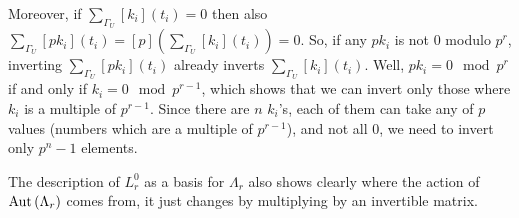 \begin{remark}
	Moreover, if $\sum_{\Gamma_U} [k_i]\left(t_i\right) = 0$ then also $\sum_{\Gamma_U} [p k_i]\left(t_i\right) = \left[p\right]\left(\sum_{\Gamma_U} [k_i]\left(t_i\right)\right) = 0$.
	So, if any $p k_i$ is not $0$ modulo $p^r$, inverting $\sum_{\Gamma_U} [p k_i]\left(t_i\right)$ already inverts $\sum_{\Gamma_U} [k_i]\left(t_i\right)$.
	Well, $p k_i = 0 \mod p^r$ if and only if $k_i = 0 \mod p^{r-1}$, which shows that we can invert only those where $k_i$ is a multiple of $p^{r-1}$.
	Since there are $n$ $k_i$'s, each of them can take any of $p$ values (numbers which are a multiple of $p^{r-1}$), and not all $0$, we need to invert only $p^n - 1$ elements.
	
	The description of $L_r^0$ as a basis for $\Lambda_r$ also shows clearly where the action of $\operatorname{Aut} \left(\Lambda_r\right)$ comes from, it just changes by multiplying by an invertible matrix.
\end{remark}

